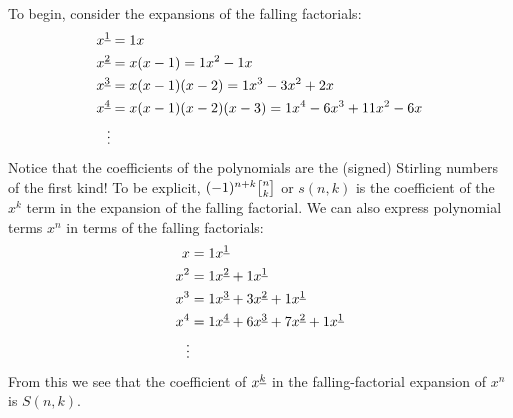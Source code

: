 To begin, consider the expansions of the falling factorials: 
\begin{align*}
	{x}^{\underline{1}} &= 1x \\
	{x}^{\underline{2}} &= x(x-1) = 1x^2 - 1x\\
	{x}^{\underline{3}} &= x(x-1)(x-2) = 1x^3 - 3x^2 + 2x \\
	{x}^{\underline{4}} &= x(x-1)(x-2)(x-3) = 1x^4 - 6x^3 + 11x^2 - 6x \\
	\vdots 
\end{align*}
Notice that the coefficients of the polynomials are the (signed) Stirling numbers of the first kind! To be explicit, $(-1)^{n+k}\stirlingone{n}{k}$ or $s(n, k)$ is the coefficient of the $x^{k}$ term in the expansion of the falling factorial. 
We can also express polynomial terms $x^n$ in terms of the falling factorials:
\begin{align*}
	x &= 1 {x}^{\underline{1}} \\
	x^2 &= 1 {x}^{\underline{2}} + 1 {x}^{\underline{1}} \\
	x^3 &= 1 {x}^{\underline{3}} + 3 {x}^{\underline{2}} + 1 {x}^{\underline{1}} \\
	x^4 &= 1 {x}^{\underline{4}} + 6 {x}^{\underline{3}} + 7 {x}^{\underline{2}} + 1 {x}^{\underline{1}} \\
	\vdots
\end{align*}
From this we see that the coefficient of ${x}^{\underline{k}}$ in the falling-factorial expansion of $x^n$ is $S(n, k)$.

